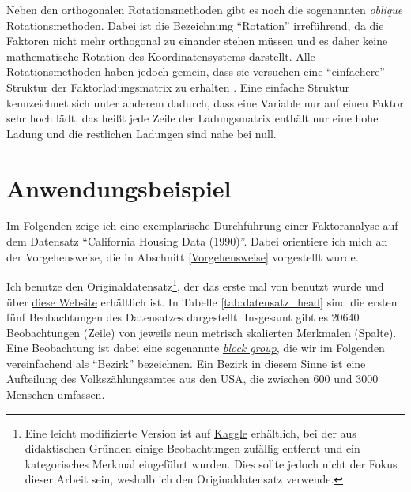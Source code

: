 \documentclass[11pt]{scrartcl}
\begin{document}
	Neben den orthogonalen Rotationsmethoden gibt es noch die sogenannten \textit{oblique} Rotationsmethoden.
	Dabei ist die Bezeichnung \enquote{Rotation} irreführend, da die Faktoren nicht mehr orthogonal zu einander stehen müssen
	und es daher keine mathematische Rotation des Koordinatensystems darstellt.
	Alle Rotationsmethoden haben jedoch gemein, dass sie versuchen eine \enquote{einfachere} Struktur
	der Faktorladungsmatrix zu erhalten \parencite[vgl.][145]{Everitt.2011}. Eine einfache Struktur kennzeichnet sich
	unter anderem dadurch, dass eine Variable nur auf einen Faktor sehr hoch lädt, das heißt jede Zeile der Ladungsmatrix
	enthält nur eine hohe Ladung und die restlichen Ladungen sind nahe bei null.
	
	\newpage
	\section{Anwendungsbeispiel}
	\label{Anwendungsbeispiel}
	Im Folgenden zeige ich eine exemplarische Durchführung einer Faktoranalyse auf dem Datensatz \enquote{California Housing Data (1990)}.
	Dabei orientiere ich mich an der Vorgehensweise, die in Abschnitt \ref{Vorgehensweise} vorgestellt wurde.

	Ich benutze den Originaldatensatz\footnote{Eine leicht modifizierte Version ist auf \href{https://www.kaggle.com/harrywang/housing}{Kaggle} erhältlich, bei der aus didaktischen Gründen einige Beobachtungen zufällig entfernt und ein kategorisches Merkmal eingeführt wurden. Dies sollte jedoch nicht der Fokus dieser Arbeit sein, weshalb ich den Originaldatensatz verwende.}, der das erste mal von \textcite{KelleyPace.1997} benutzt wurde und über
	\href{https://www.dcc.fc.up.pt/~ltorgo/Regression/cal_housing.html}{diese Website} erhältlich ist. In Tabelle \ref{tab:datensatz_head} sind die ersten fünf Beobachtungen des Datensatzes dargestellt.
	Insgesamt gibt es 20640 Beobachtungen (Zeile) von jeweils neun metrisch skalierten Merkmalen (Spalte). Eine Beobachtung ist dabei eine sogenannte \href{https://www.census.gov/programs-surveys/geography/about/glossary.html#par_textimage_4}{\textit{block group}}, die wir im Folgenden vereinfachend als \enquote{Bezirk} bezeichnen.
	Ein Bezirk in diesem Sinne ist eine Aufteilung des Volkszählungsamtes aus den USA, die zwischen 600 und 3000 Menschen umfassen.
\end{document}
